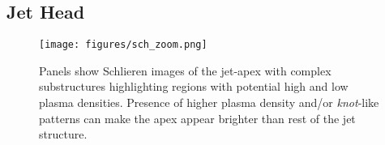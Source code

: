 \documentclass[12pt]{ociamthesis}
\begin{document}
\subsection{Jet Head}
\label{subsec:j_head}
\begin{figure}
\centering
{\texttt{[image: figures/sch\_zoom.png]}} 
\caption{Panels show Schlieren images of the jet-apex with complex substructures highlighting regions with potential high and low plasma densities. Presence of higher plasma density and/or \textit{knot}-like patterns can make the apex appear brighter than rest of the jet structure.}
\label{basic setup}
\end{figure} 
\end{document}
